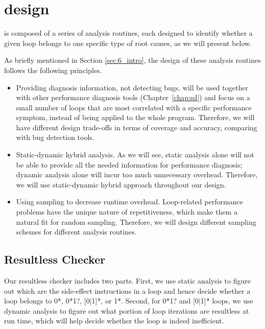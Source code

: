 \section{\Tool design}
\label{sec:6_design}
\Tool is composed of a series of analysis routines, each designed to 
identify whether a given loop belongs to one specific type of root causes,
as we will present below. 

As briefly mentioned in Section \ref{sec:6_intro}, the design of these analysis routines follows the following principles.
\begin{itemize}
\item Providing diagnosis information, not detecting bugs. \Tool will be  
used together with other performance diagnosis tools (Chapter~\ref{chap:sd})
and focus on a small
number of loops that are most correlated with a specific performance symptom,
instead of being applied to the whole program. Therefore, we will have different
design trade-offs in terms of coverage and accuracy, comparing with 
bug detection tools.

\item Static-dynamic hybrid analysis. As we will see, static analysis alone
will not be able to provide all the needed information for performance
diagnosis; dynamic analysis alone will incur too much unnecessary overhead.
Therefore, we will use static-dynamic hybrid approach throughout our design.

\item Using sampling to decrease runtime overhead. Loop-related 
performance problems have the unique nature of repetitiveness, which make 
them a natural fit for random sampling. Therefore, we will design different
sampling schemes for different analysis routines.
\end{itemize}

\subsection{Resultless Checker}
\label{sec:6_workless}

Our resultless checker includes two parts. First, we use static analysis
to figure out which are the side-effect instructions in a loop and hence
decide whether a loop belongs to 0*, 0*1?, [0$|$1]*, or 1*. Second, for
0*1? and [0$|$1]* loops, we use
dynamic analysis to figure out what portion of loop iterations are
resultless at run time, which will help decide whether the loop is indeed
inefficient.


